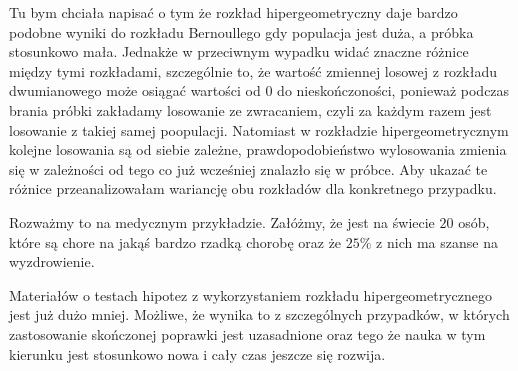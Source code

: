 Tu bym chciała napisać o tym że rozkład hipergeometryczny daje bardzo podobne wyniki do rozkładu Bernoullego gdy populacja jest duża, a  próbka stosunkowo mała. Jednakże w przeciwnym wypadku widać znaczne różnice między tymi rozkładami, szczególnie to, że wartość zmiennej losowej z rozkładu dwumianowego może osiągać wartości od $0$ do nieskończoności, ponieważ podczas brania próbki zakładamy losowanie ze zwracaniem, czyli za każdym razem jest losowanie z takiej samej poopulacji. Natomiast w rozkładzie hipergeometrycznym kolejne losowania są od siebie zależne, prawdopodobieństwo wylosowania zmienia się w zależności od tego co już wcześniej znalazło się w próbce. Aby ukazać te różnice przeanalizowałam wariancję obu rozkładów dla konkretnego przypadku.

Rozważmy to na medycznym przykładzie. Załóżmy, że jest na świecie $20$ osób, które są chore na jakąś bardzo rzadką chorobę oraz że $25\%$ z nich ma szanse na wyzdrowienie. 




Materiałów o testach hipotez z wykorzystaniem rozkładu hipergeometrycznego jest już dużo mniej. Możliwe, że wynika to z szczególnych przypadków, w których zastosowanie skończonej poprawki jest uzasadnione oraz tego że nauka w tym kierunku jest stosunkowo nowa i cały czas jeszcze się rozwija.